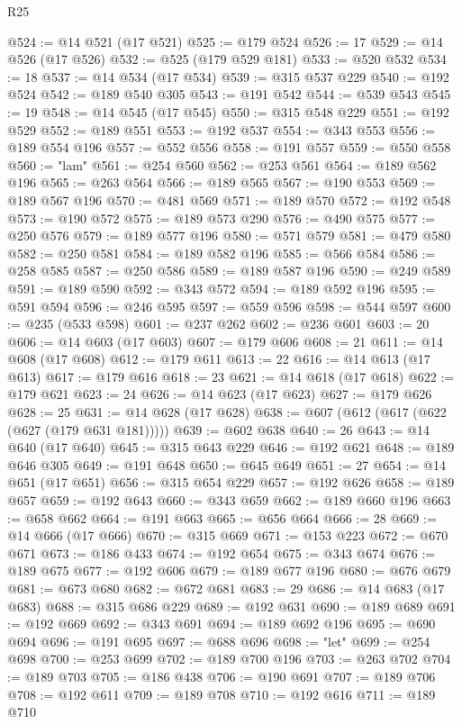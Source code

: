 \begin{lexlean}{R25}
\begin{coremodule}
@524 := @14 @521 (@17 @521)
@525 := @179 @524
@526 := 17
@529 := @14 @526 (@17 @526)
@532 := @525 (@179 @529 @181)
@533 := @520 @532
@534 := 18
@537 := @14 @534 (@17 @534)
@539 := @315 @537 @229
@540 := @192 @524
@542 := @189 @540 @305
@543 := @191 @542
@544 := @539 @543
@545 := 19
@548 := @14 @545 (@17 @545)
@550 := @315 @548 @229
@551 := @192 @529
@552 := @189 @551
@553 := @192 @537
@554 := @343 @553
@556 := @189 @554 @196
@557 := @552 @556
@558 := @191 @557
@559 := @550 @558
@560 := "lam"
@561 := @254 @560
@562 := @253 @561
@564 := @189 @562 @196
@565 := @263 @564
@566 := @189 @565
@567 := @190 @553
@569 := @189 @567 @196
@570 := @481 @569
@571 := @189 @570
@572 := @192 @548
@573 := @190 @572
@575 := @189 @573 @290
@576 := @490 @575
@577 := @250 @576
@579 := @189 @577 @196
@580 := @571 @579
@581 := @479 @580
@582 := @250 @581
@584 := @189 @582 @196
@585 := @566 @584
@586 := @258 @585
@587 := @250 @586
@589 := @189 @587 @196
@590 := @249 @589
@591 := @189 @590
@592 := @343 @572
@594 := @189 @592 @196
@595 := @591 @594
@596 := @246 @595
@597 := @559 @596
@598 := @544 @597
@600 := @235 (@533 @598)
@601 := @237 @262
@602 := @236 @601
@603 := 20
@606 := @14 @603 (@17 @603)
@607 := @179 @606
@608 := 21
@611 := @14 @608 (@17 @608)
@612 := @179 @611
@613 := 22
@616 := @14 @613 (@17 @613)
@617 := @179 @616
@618 := 23
@621 := @14 @618 (@17 @618)
@622 := @179 @621
@623 := 24
@626 := @14 @623 (@17 @623)
@627 := @179 @626
@628 := 25
@631 := @14 @628 (@17 @628)
@638 := @607 (@612 (@617 (@622 (@627 (@179 @631 @181)))))
@639 := @602 @638
@640 := 26
@643 := @14 @640 (@17 @640)
@645 := @315 @643 @229
@646 := @192 @621
@648 := @189 @646 @305
@649 := @191 @648
@650 := @645 @649
@651 := 27
@654 := @14 @651 (@17 @651)
@656 := @315 @654 @229
@657 := @192 @626
@658 := @189 @657
@659 := @192 @643
@660 := @343 @659
@662 := @189 @660 @196
@663 := @658 @662
@664 := @191 @663
@665 := @656 @664
@666 := 28
@669 := @14 @666 (@17 @666)
@670 := @315 @669
@671 := @153 @223
@672 := @670 @671
@673 := @186 @433
@674 := @192 @654
@675 := @343 @674
@676 := @189 @675
@677 := @192 @606
@679 := @189 @677 @196
@680 := @676 @679
@681 := @673 @680
@682 := @672 @681
@683 := 29
@686 := @14 @683 (@17 @683)
@688 := @315 @686 @229
@689 := @192 @631
@690 := @189 @689
@691 := @192 @669
@692 := @343 @691
@694 := @189 @692 @196
@695 := @690 @694
@696 := @191 @695
@697 := @688 @696
@698 := "let"
@699 := @254 @698
@700 := @253 @699
@702 := @189 @700 @196
@703 := @263 @702
@704 := @189 @703
@705 := @186 @438
@706 := @190 @691
@707 := @189 @706
@708 := @192 @611
@709 := @189 @708
@710 := @192 @616
@711 := @189 @710

\end{coremodule}
\end{lexlean}
